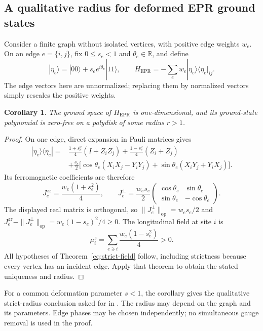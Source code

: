 \documentclass[reqno]{amsart}
\newtheorem{corollary}[theorem]{Corollary}
\theoremstyle{definition}
\theoremstyle{remark}
\newcommand{\R}{\mathbb R}
\begin{document}
\subsection{A qualitative radius for deformed EPR ground states}

Consider a finite graph without isolated vertices, with positive edge
weights \(w_e\).  On an edge \(e=\{i,j\}\), fix
\(0\le s_e<1\) and \(\theta_e\in\R\), and define
\[
 |\eta_e\rangle=|00\rangle+s_e e^{i\theta_e}|11\rangle,
 \qquad H_{\mathrm{EPR}}=-\sum_e w_e
 |\eta_e\rangle\langle\eta_e|_{ij}.
\]
The edge vectors here are unnormalized; replacing them by normalized
vectors simply rescales the positive weights.

\begin{corollary}\label{eq:epr}
The ground space of \(H_{\mathrm{EPR}}\) is one-dimensional, and
its ground-state polynomial is zero-free on a polydisk of some radius
\(r>1\).
\end{corollary}
\begin{proof}
On one edge, direct expansion in Pauli matrices gives
\begin{align*}
 |\eta_e\rangle\langle\eta_e|
 ={}&\frac{1+s_e^2}{4}(I+Z_iZ_j)
    +\frac{1-s_e^2}{4}(Z_i+Z_j)\\
 &+\frac{s_e}{2}\bigl[
      \cos\theta_e(X_iX_j-Y_iY_j)
      +\sin\theta_e(X_iY_j+Y_iX_j)\bigr].
\end{align*}
Its ferromagnetic coefficients are therefore
\[
 J_e^{zz}=\frac{w_e(1+s_e^2)}4,\qquad
 J_e^\perp=\frac{w_es_e}{2}
 \begin{pmatrix}\cos\theta_e&\sin\theta_e\\
                 \sin\theta_e&-\cos\theta_e\end{pmatrix}.
\]
The displayed real matrix is orthogonal, so
\(\|J_e^\perp\|_{\mathrm{op}}=w_es_e/2\) and
\(J_e^{zz}-\|J_e^\perp\|_{\mathrm{op}}
 =w_e(1-s_e)^2/4\ge0\).  The longitudinal field at site \(i\) is
\[
 \mu_i^z=\sum_{e\ni i}\frac{w_e(1-s_e^2)}4>0.
\]
All hypotheses of Theorem~\ref{eq:strict-field} follow, including
strictness because every vertex has an incident edge.  Apply that
theorem to obtain the stated uniqueness and radius.
\end{proof}

For a common deformation parameter \(s<1\), the corollary gives
the qualitative strict-radius conclusion asked for in
\cite[Conjecture~1]{WBG26}.  The radius may depend on the graph
and its parameters.  Edge phases may be chosen
independently; no simultaneous gauge removal is used in the proof.
\end{document}
